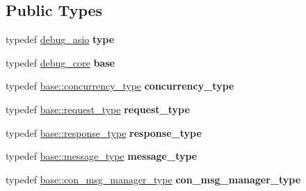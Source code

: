 \subsection*{Public Types}
\begin{DoxyCompactItemize}
\item 
\mbox{\label{structwebsocketpp_1_1config_1_1debug__asio_a10a7037cdb25a39e64780105e83147d0}} 
typedef \mbox{\hyperlink{structwebsocketpp_1_1config_1_1debug__asio}{debug\+\_\+asio}} {\bfseries type}
\item 
\mbox{\label{structwebsocketpp_1_1config_1_1debug__asio_ae2b3c4a01c27b2f26bc98419543744cd}} 
typedef \mbox{\hyperlink{structwebsocketpp_1_1config_1_1debug__core}{debug\+\_\+core}} {\bfseries base}
\item 
\mbox{\label{structwebsocketpp_1_1config_1_1debug__asio_ad3c746d7e71d7414c054a254418b93d1}} 
typedef \mbox{\hyperlink{classwebsocketpp_1_1concurrency_1_1basic}{base\+::concurrency\+\_\+type}} {\bfseries concurrency\+\_\+type}
\item 
\mbox{\label{structwebsocketpp_1_1config_1_1debug__asio_a4e52af4648f2afcd527b3e5587d8c8ea}} 
typedef \mbox{\hyperlink{classwebsocketpp_1_1http_1_1parser_1_1request}{base\+::request\+\_\+type}} {\bfseries request\+\_\+type}
\item 
\mbox{\label{structwebsocketpp_1_1config_1_1debug__asio_ac59f3572fc37e0ebe1ffbfcd4d4f006b}} 
typedef \mbox{\hyperlink{classwebsocketpp_1_1http_1_1parser_1_1response}{base\+::response\+\_\+type}} {\bfseries response\+\_\+type}
\item 
\mbox{\label{structwebsocketpp_1_1config_1_1debug__asio_aaf34fbc85d12c93050cb41bc5c4cdbda}} 
typedef \mbox{\hyperlink{classwebsocketpp_1_1message__buffer_1_1message}{base\+::message\+\_\+type}} {\bfseries message\+\_\+type}
\item 
\mbox{\label{structwebsocketpp_1_1config_1_1debug__asio_a81c47526ef346c02dd630dbb5ed7a81e}} 
typedef \mbox{\hyperlink{classwebsocketpp_1_1message__buffer_1_1alloc_1_1con__msg__manager}{base\+::con\+\_\+msg\+\_\+manager\+\_\+type}} {\bfseries con\+\_\+msg\+\_\+manager\+\_\+type}

\end{DoxyCompactItemize}
